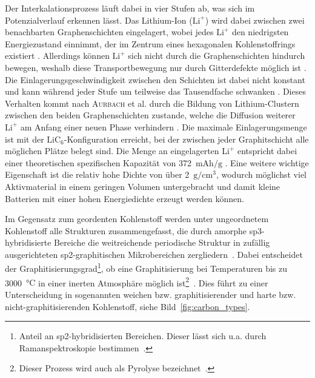 Der Interkalationsprozess läuft dabei in vier Stufen ab, was sich im Potenzialverlauf erkennen lässt. Das Lithium-Ion ($\text{Li}^{+}$) wird dabei zwischen zwei benachbarten Graphenschichten eingelagert, wobei jedes $\text{Li}^{+}$ den niedrigsten Energiezustand einnimmt, der im Zentrum eines hexagonalen Kohlenstoffrings existiert \cite{Sole2014,Weng2023}. Allerdings können $\text{Li}^{+}$ sich nicht durch die Graphenschichten hindurch bewegen, weshalb diese Transportbewegung nur durch Gitterdefekte möglich ist \cite{Nishidate2005}. Die Einlagerungsgeschwindigkeit zwischen den Schichten ist dabei nicht konstant und kann während jeder Stufe um teilweise das Tausendfache schwanken \cite{Levi1997}. Dieses Verhalten kommt nach \textsc{Aurbach} et al. durch die Bildung von Lithium-Clustern zwischen den beiden Graphenschichten zustande, welche die Diffusion weiterer $\text{Li}^{+}$ am Anfang einer neuen Phase verhindern \cite{Markevich2005}. Die maximale Einlagerungsmenge ist mit der $\text{LiC}_\text{6}$-Konfiguration erreicht, bei der zwischen jeder Graphitschicht alle möglichen Plätze belegt sind. Die Menge an eingelagerten $\text{Li}^{+}$ entspricht dabei einer theoretischen spezifischen Kapazität von 372~$\si{\mA \hour \per \g}$ \cite{Winter1998}. 
Eine weitere wichtige Eigenschaft ist die relativ hohe Dichte von über 2~$\si{\g \per \cm \cubed}$, wodurch möglichst viel Aktivmaterial in einem geringen Volumen untergebracht und damit kleine Batterien mit einer hohen Energiedichte erzeugt werden können.

Im Gegensatz zum geordenten Kohlenstoff werden unter ungeordnetem Kohlenstoff alle Strukturen zusammengefasst, die durch amorphe sp3-hybridisierte Bereiche die weitreichende periodische Struktur in zufällig ausgerichteten sp2-graphitischen Mikrobereichen zergliedern~\cite{Inagaki2014}. Dabei entscheidet der Graphitisierungsgrad\footnote{Anteil an sp2-hybridisierten Bereichen. Dieser lässt sich u.a. durch Ramanspektroskopie bestimmen~\cite{Yu2014}.}, ob eine Graphitisierung bei Temperaturen bis zu 3000~$\si{\degreeCelsius}$ in einer inerten Atmosphäre möglich ist\footnote{Dieser Prozess wird auch als Pyrolyse bezeichnet~\cite{Kim2017a}.}~\cite{Inagaki2014}. Dies führt zu einer Unterscheidung in sogenannten weichen bzw. graphitisierender und harte bzw. nicht-graphitisierenden Kohlenstoff, siehe Bild~\ref{fig:carbon_types}.

